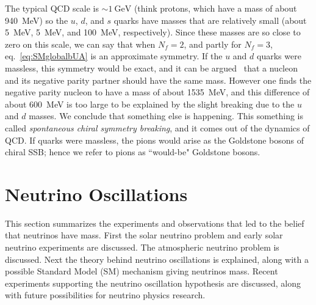 The typical QCD scale is $\sim1~\text{GeV}$ (think protons, which have a 
mass of about 940~MeV) so the $u$, $d$, and $s$ quarks have masses that
are relatively small (about 5~MeV, 5~MeV, and 100~MeV, respectively).
Since these masses are so close to zero on this scale, we can say that
when $N_f=2$, and partly for $N_f=3$, eq.~\eqref{eq:SMglobalbUA} is
an approximate symmetry. If the $u$ and $d$ quarks were massless, this symmetry
would be exact, and it can be argued~\cite{gattringer_quantum_2010} that
a nucleon and its negative parity partner should have the same mass. 
However one finds the negative parity nucleon to have
a mass of about 1535~MeV, and this difference of about 600~MeV is too large to
be explained by the slight breaking due to the $u$ and $d$ masses. We
conclude that something else is happening. This something is called 
{\it spontaneous chiral symmetry breaking}, and it comes out of the
dynamics of QCD. If quarks were massless, the pions would arise as 
the Goldstone bosons of chiral SSB; hence we refer to pions as 
``would-be" Goldstone bosons.


\section{Neutrino Oscillations}
This section summarizes the experiments and observations that led to the belief
that neutrinos have mass. First the solar neutrino problem and early solar
neutrino experiments are discussed. The atmospheric neutrino problem is
discussed. Next the theory behind neutrino oscillations is explained, along
with a possible Standard Model (SM) mechanism giving neutrinos mass. Recent
experiments supporting the neutrino oscillation hypothesis are discussed,
along with future possibilities for neutrino physics research.


